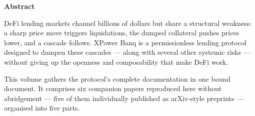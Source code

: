 
\thispagestyle{empty}
\maketitle



\vspace*{\fill}
\begin{center}
\end{center}
\vspace*{\fill}
\clearpage

\thispagestyle{empty}
\vspace*{\fill}
\begin{center}{\large\bfseries Abstract}\end{center}
\medskip
\begingroup
\small
\noindent
DeFi lending markets channel billions of dollars but share a structural weakness: a sharp price move triggers liquidations, the dumped collateral pushes prices lower, and a cascade follows. XPower Banq is a permissionless lending protocol designed to dampen these cascades — along with several other systemic risks — without giving up the openness and composability that make DeFi work.

\medskip
\noindent
This volume gathers the protocol's complete documentation in one bound document. It comprises six companion papers reproduced here without abridgement — five of them individually published as arXiv-style preprints — organised into five parts.

